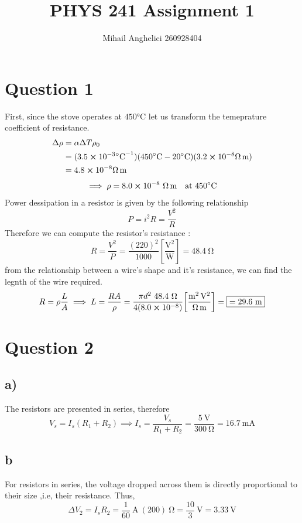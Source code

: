 \documentclass[
	12pt,
	]{article}
\title{PHYS 241 Assignment 1}
\author{Mihail Anghelici 260928404}
\date{\empty}
\theoremstyle{definition}
\theoremstyle{definition}
\theoremstyle{definition}
\theoremstyle{definition}
\theoremstyle{definition}
\theoremstyle{example}
\theoremstyle{note}
\theoremstyle{remark}
\theoremstyle{example}
\begin{document}
	\maketitle
	\section{Question 1}
		First, since the stove operates at $450 \si{\degreeCelsius}$ let us transform the temeprature coefficient of resistance.
		\begin{align*}
			 \Delta \rho &= \alpha \Delta T \rho_{0}\\
			 &= (3.5 \cross 10^{-3} \si{\per\degreeCelsius})(450 \si\degreeCelsius - 20\si\degreeCelsius)(3.2\cross 10^{-8} \si{\ohm\meter})	\\
			 &= 4.8 \cross 10^{-8} \si{\ohm\meter} 
		\end{align*}
		$$  \implies \rho = 8.0 \cross 10^{-8} \ \si{\ohm \meter}\quad \text{at $450 \si{\degreeCelsius}$} $$
		Power dessipation in a resistor is given by the following relationship
		$$ P = i^{2}R =\frac{V^{2}}{R}$$
		Therefore we can compute the resistor's resistance : 
		$$ R = \frac{V^{2}}{P} = \frac{(220)^{2}}{1000} \left[\frac{\si{\volt\squared}}{\si{\watt}}\right] = 48.4 \ \si{\ohm}$$
		from the relationship between a wire's shape and it's resistance, we can find the legnth of the wire required.
		\begin{equation*}
			 R = \rho \frac{L}{A} \implies L = \frac{RA }{\rho} =\frac{\pi d^{2} \ 48.4 \ \si{\ohm}}{4(8.0\cross 10^{-8})} \bigg[\frac{\si{\meter\squared \volt\squared}}{\si{\ohm\meter}}\bigg] = \boxed{= 29.6 \ \si{\meter}}
		\end{equation*}
		 \section{Question 2}
		 	\subsection{a) }
		 		The resistors are presented in series, therefore 
		 		$$ V_{s} = I_{s}(R_{1}+R_{2}) \implies I_{s} = \frac{V_{s}}{R_{1}+R_{2}} = \frac{5 \ \si{\volt}}{300 \ \si{\ohm}} = 16.7 \ \si{\milli\ampere}$$
		 	\subsection{b} 
		 		For resistors in series, the voltage dropped across them is directly proportional to their size ,i.e, their resistance. Thus, 
		 		$$ \Delta V_{2} = I_{s}R_{2} = \frac{1}{60} \ \si{\ampere} \ (200) \ \si{\ohm} = \frac{10}{3} \ \si{\volt} = 3.33 \ \si{\volt}$$
\end{document}
